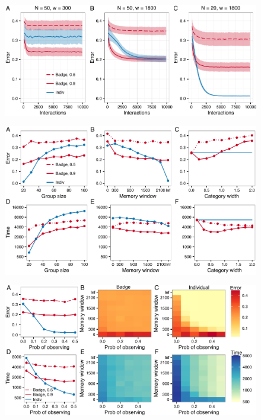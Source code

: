 \setcounter{figure}{0}
\begin{figure}
\includegraphics[width=.95\textwidth]{figures/learning_curves.pdf}
\caption{}
\end{figure}


\begin{figure}
\includegraphics[width=6.85in]{figures/parameters.pdf}
\caption{}
\end{figure}

\begin{figure}
\includegraphics[width=6.85in]{figures/observational_learning.pdf}
\caption{}
\end{figure}

